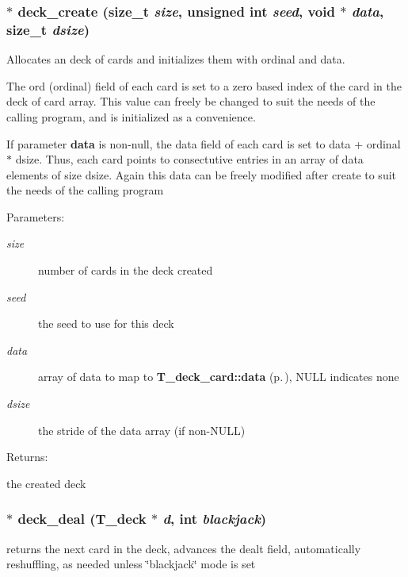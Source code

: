 \subsubsection{$\ast$ deck\_\-create (size\_\-t {\em size}, unsigned int {\em seed}, void $\ast$ {\em data}, size\_\-t {\em dsize})}\label{group__deck_a0}


Allocates an deck of cards and initializes them with ordinal and data.

The ord (ordinal) field of each card is set to a zero based index of the  card in the deck of card array. This value can freely be changed to suit the needs of the calling program, and is initialized as a convenience.

If parameter {\bf data} is non-null, the data field of each card is set to data + ordinal $\ast$ dsize. Thus, each card points to consectutive entries in an array of data elements of size dsize. Again this data can be freely modified after create to suit the needs of the calling program\begin{Desc}
\item[Parameters: ]\par
\begin{description}
\item[{\em 
size}]number of cards in the deck created \item[{\em 
seed}]the seed to use for this deck \item[{\em 
data}]array of data to map to {\bf T\_\-deck\_\-card::data} {\rm (p.\,\pageref{structT__deck__card_m1})}, NULL indicates none \item[{\em 
dsize}]the stride of the data array (if non-NULL) \end{description}
\end{Desc}
\begin{Desc}
\item[Returns: ]\par
the created deck \end{Desc}
\subsubsection{$\ast$ deck\_\-deal ({\bf T\_\-deck} $\ast$ {\em d}, int {\em blackjack})}\label{group__deck_a3}


returns the next card in the deck, advances the dealt field, automatically reshuffling, as needed unless \char`\"{}blackjack\char`\"{} mode is set

